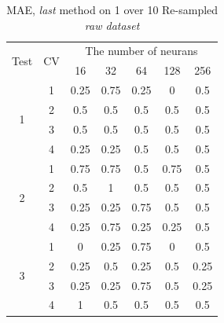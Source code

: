 \documentclass[draft,dvipsnames]{drexel-thesis}
\begin{document}
\begin{thesis}
\begin{table}[!t]
\centering
\caption{MAE, {\em last} method on 1 over 10 Re-sampled {\em raw dataset}}
\label{tbl:mae_last_1_10}
\begin{tabular}{|c|c|c|c|c|c|c|}
\hline
\multirow{2}{*}{Test} & \multirow{2}{*}{CV} & \multicolumn{5}{c|}{The number of neurans}                               \\ \cline{3-7}
                      &                     & 16           & 32           & 64           & 128          & 256          \\ \hline
\multirow{4}{*}{1}    & 1                   & 0.25         & 0.75         & 0.25         & 0            & 0.5          \\ \cline{2-7}
                      & 2                   & 0.5          & 0.5          & 0.5          & 0.5          & 0.5          \\ \cline{2-7}
                      & 3                   & 0.5          & 0.5          & 0.5          & 0.5          & 0.5          \\ \cline{2-7}
                      & 4                   & 0.25         & 0.25         & 0.5          & 0.5          & 0.5          \\ \hline
\multirow{4}{*}{2}    & 1                   & 0.75         & 0.75         & 0.5          & 0.75         & 0.5          \\ \cline{2-7}
                      & 2                   & 0.5          & 1            & 0.5          & 0.5          & 0.5          \\ \cline{2-7}
                      & 3                   & 0.25         & 0.25         & 0.75         & 0.5          & 0.5          \\ \cline{2-7}
                      & 4                   & 0.25         & 0.75         & 0.25         & 0.25         & 0.5          \\ \hline
\multirow{4}{*}{3}    & 1                   & 0            & 0.25         & 0.75         & 0            & 0.5          \\ \cline{2-7}
                      & 2                   & 0.25         & 0.5          & 0.25         & 0.5          & 0.25         \\ \cline{2-7}
                      & 3                   & 0.25         & 0.25         & 0.75         & 0.5          & 0.25         \\ \cline{2-7}
                      & 4                   & 1            & 0.5          & 0.5          & 0.5          & 0.5          \\ \hline

\end{tabular}
\end{table}
\end{thesis}
\end{document}
